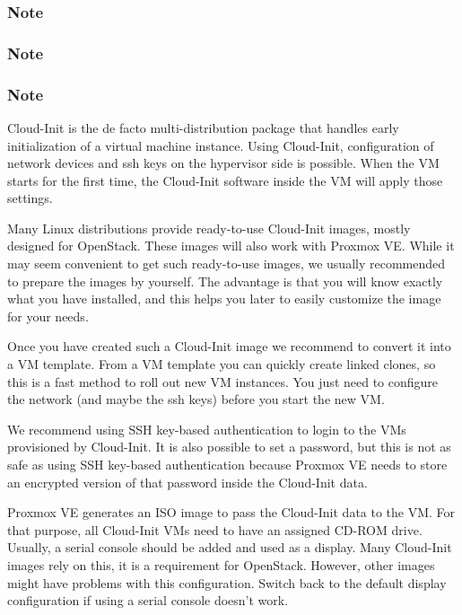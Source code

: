 \subsubsection{Note}

\subsubsection{Note}

\subsubsection{Note}

Cloud-Init is the de facto multi-distribution package that handles early initialization of a virtual machine instance. Using Cloud-Init, configuration of network devices and ssh keys on the hypervisor side is possible. When the VM starts for the first time, the Cloud-Init software inside the VM will apply those settings.

Many Linux distributions provide ready-to-use Cloud-Init images, mostly designed for OpenStack. These images will also work with Proxmox VE. While it may seem convenient to get such ready-to-use images, we usually recommended to prepare the images by yourself. The advantage is that you will know exactly what you have installed, and this helps you later to easily customize the image for your needs.

Once you have created such a Cloud-Init image we recommend to convert it into a VM template. From a VM template you can quickly create linked clones, so this is a fast method to roll out new VM instances. You just need to configure the network (and maybe the ssh keys) before you start the new VM.

We recommend using SSH key-based authentication to login to the VMs provisioned by Cloud-Init. It is also possible to set a password, but this is not as safe as using SSH key-based authentication because Proxmox VE needs to store an encrypted version of that password inside the Cloud-Init data.

Proxmox VE generates an ISO image to pass the Cloud-Init data to the VM. For that purpose, all Cloud-Init VMs need to have an assigned CD-ROM drive. Usually, a serial console should be added and used as a display. Many Cloud-Init images rely on this, it is a requirement for OpenStack. However, other images might have problems with this configuration. Switch back to the default display configuration if using a serial console doesn’t work.

